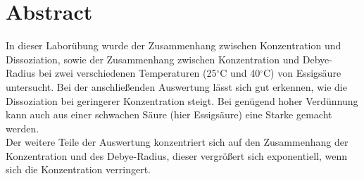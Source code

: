 \section{Abstract}
In dieser Laborübung wurde der Zusammenhang zwischen Konzentration
und Dissoziation, sowie der Zusammenhang zwischen Konzentration und
Debye-Radius bei zwei verschiedenen Temperaturen (25$^\circ$C
und 40$^\circ$C) von Essigsäure untersucht. Bei der anschließenden Auswertung
lässt sich gut erkennen, wie die Dissoziation bei geringerer Konzentration steigt. Bei genügend hoher Verdünnung kann auch
aus einer schwachen Säure (hier Essigsäure) eine Starke gemacht werden. \\
Der weitere Teile der Auswertung konzentriert sich auf den Zusammenhang der Konzentration und des Debye-Radius, dieser 
vergrößert sich exponentiell, wenn sich die Konzentration verringert.   



